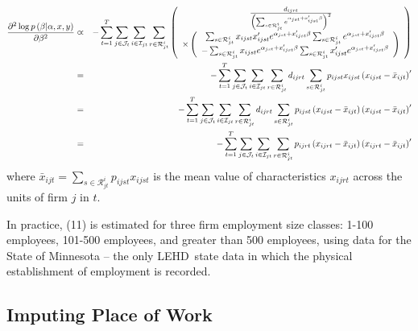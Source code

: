\begin{eqnarray}
\frac{\partial ^{2}\log p\left( \beta |\alpha ,x,y\right) }{\partial \beta
^{2}} &\varpropto &-\sum_{t=1}^{T}\sum_{j\in \mathcal{J}_{t}}\sum_{i\in 
\mathcal{I}_{jt}}\sum_{r\in \mathcal{R}_{jt}^{i}}\left( 
\begin{array}{c}
\frac{d_{ijrt}}{\left( \sum_{s\in \mathcal{R}_{jt}^{i}}e^{\alpha
_{jst}+x_{ijst}^{\prime }\beta }\right) ^{2}} \\ 
\times \left( 
\begin{array}{c}
\sum_{s\in \mathcal{R}_{jt}^{i}}x_{ijst}x_{ijst}^{\prime }e^{\alpha
_{jst}+x_{ijst}^{\prime }\beta }\sum_{s\in \mathcal{R}_{jt}^{i}}e^{\alpha
_{jst}+x_{ijst}^{\prime }\beta } \\ 
-\sum_{s\in \mathcal{R}_{jt}^{i}}x_{ijst}e^{\alpha _{jst}+x_{ijst}^{\prime
}\beta }\sum_{s\in \mathcal{R}_{jt}^{i}}x_{ijst}^{\prime }e^{\alpha
_{jst}+x_{ijst}^{\prime }\beta }%
\end{array}%
\right)%
\end{array}%
\right)  \notag \\
&=&-\sum_{t=1}^{T}\sum_{j\in \mathcal{J}_{t}}\sum_{i\in \mathcal{I}%
_{jt}}\sum_{r\in \mathcal{R}_{jt}^{i}}d_{ijrt}\sum_{s\in \mathcal{R}%
_{jt}^{i}}p_{ijst}x_{ijst}\left( x_{ijst}-\bar{x}_{ijt}\right) ^{\prime } 
\notag \\
&=&-\sum_{t=1}^{T}\sum_{j\in \mathcal{J}_{t}}\sum_{i\in \mathcal{I}%
_{jt}}\sum_{r\in \mathcal{R}_{jt}^{i}}d_{ijrt}\sum_{s\in \mathcal{R}%
_{jt}^{i}}p_{ijst}\left( x_{ijst}-\bar{x}_{ijt}\right) \left( x_{ijst}-\bar{x%
}_{ijt}\right) ^{\prime }  \notag \\
&=&-\sum_{t=1}^{T}\sum_{j\in \mathcal{J}_{t}}\sum_{i\in \mathcal{I}%
_{jt}}\sum_{r\in \mathcal{R}_{jt}^{i}}p_{ijrt}\left( x_{ijrt}-\bar{x}%
_{ijt}\right) \left( x_{ijrt}-\bar{x}_{ijt}\right) ^{\prime }
\label{hessian}
\end{eqnarray}%
where $\bar{x}_{ijt}=\sum_{s\in \mathcal{R}_{jt}^{i}}p_{ijst}x_{ijst}$ is
the mean value of characteristics $x_{ijrt}$ across the units of firm $j$ in 
$t.$

In practice, (11) is estimated for three firm employment size classes: 1-100
employees, 101-500 employees, and greater than 500 employees, using data for
the State of Minnesota -- the only LEHD\ state data in which the physical
establishment of employment is recorded.

\subsection{Imputing Place of Work}


